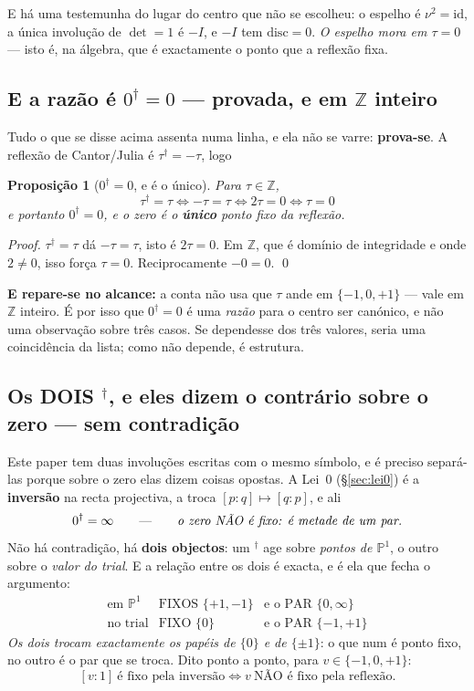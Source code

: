 \documentclass[11pt,a4paper]{article}
\newtheorem{proposicao}[teorema]{Proposição}
\newcommand{\dg}{^{\dagger}}
\begin{document}
E há uma testemunha do lugar do centro que não se escolheu: o espelho é $\nu^2=\mathrm{id}$,
a única involução de $\det=1$ é $-I$, e $-I$ tem $\mathrm{disc}=0$. \emph{O espelho mora
em $\tau=0$} --- isto é, na álgebra, que é exactamente o ponto que a reflexão fixa.

\subsection*{E a razão é $0\dg=0$ --- provada, e em $\mathbb{Z}$ inteiro}

Tudo o que se disse acima assenta numa linha, e ela não se varre: \textbf{prova-se}. A
reflexão de Cantor/Julia é $\tau\dg=-\tau$, logo

\begin{proposicao}[$0\dg=0$, e é o único]\label{prop:zero-dual-zero}
Para $\tau\in\mathbb{Z}$,
\[
\boxed{\;\tau\dg=\tau\iff-\tau=\tau\iff2\tau=0\iff\tau=0\;}
\]
e portanto $0\dg=0$, e o zero é o \textbf{único} ponto fixo da reflexão.
\end{proposicao}

\begin{proof}
$\tau\dg=\tau$ dá $-\tau=\tau$, isto é $2\tau=0$. Em $\mathbb{Z}$, que é domínio de
integridade e onde $2\neq0$, isso força $\tau=0$. Reciprocamente $-0=0$. \qed
\end{proof}

\noindent\textbf{E repare-se no alcance:} a conta não usa que $\tau$ ande em
$\{-1,0,+1\}$ --- vale em $\mathbb{Z}$ inteiro. É por isso que $0\dg=0$ é uma
\emph{razão} para o centro ser canónico, e não uma observação sobre três casos. Se
dependesse dos três valores, seria uma coincidência da lista; como não depende, é
estrutura.

\subsection*{Os DOIS $\dg$, e eles dizem o contrário sobre o zero --- sem contradição}

Este paper tem duas involuções escritas com o mesmo símbolo, e é preciso separá-las porque
sobre o zero elas dizem coisas opostas. A Lei~0 (\S\ref{sec:lei0}) é a \textbf{inversão}
na recta projectiva, a troca $[p:q]\mapsto[q:p]$, e ali
\[
0\dg=\infty
\qquad\text{---}\qquad
\emph{o zero NÃO é fixo: é metade de um par.}
\]
Não há contradição, há \textbf{dois objectos}: um $\dg$ age sobre \emph{pontos de
$\mathbb{P}^1$}, o outro sobre o \emph{valor do trial}. E a relação entre os dois é exacta,
e é ela que fecha o argumento:
\[
\boxed{
\begin{array}{lll}
\text{em }\mathbb{P}^1 & \text{FIXOS }\{+1,-1\} & \text{e o PAR }\{0,\infty\}\\[2pt]
\text{no trial} & \text{FIXO }\{0\} & \text{e o PAR }\{-1,+1\}
\end{array}}
\]
\emph{Os dois trocam exactamente os papéis de $\{0\}$ e de $\{\pm1\}$}: o que num é ponto
fixo, no outro é o par que se troca. Dito ponto a ponto, para $v\in\{-1,0,+1\}$:
\[
[v:1]\ \text{é fixo pela inversão}
\iff
v\ \text{NÃO é fixo pela reflexão}.
\]
\end{document}
